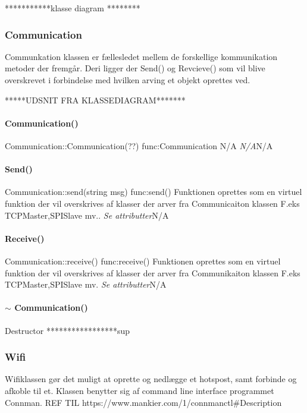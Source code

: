 ***********klasse diagram ********

\subsubsection{\textbf{Communication}}
Communkation klassen er fællesledet mellem de forskellige kommunikation metoder der fremgår. Deri ligger der Send() og Revcieve() som vil blive overskrevet i forbindelse med hvilken arving et objekt oprettes ved.

*****UDSNIT FRA KLASSEDIAGRAM*******

\paragraph{Communication()}
\begin{functionDescription}
{Communication::Communication(??)}
{func:Communication}
{N/A}
{\textit{N/A}}{N/A}
\end{functionDescription}

\paragraph{Send()}
\begin{functionDescription}
{Communication::send(string msg)}
{func:send()}
{Funktionen oprettes som en virtuel funktion der vil overskrives af klasser der arver fra Communicaiton klassen F.eks TCPMaster,SPISlave mv..}
{\textit{Se attributter}}{N/A}
\end{functionDescription}

\paragraph{Receive()}
\begin{functionDescription}
{Communication::receive()}
{func:receive()}
{Funktionen oprettes som en virtuel funktion der vil overskrives af klasser der arver fra Communikaiton klassen F.eks TCPMaster,SPISlave mv.}
{\textit{Se attributter}}{N/A}
\end{functionDescription}


\paragraph{$\sim$ Communication()}
Destructor *****************sup


\subsubsection{Wifi}
Wifiklassen gør det muligt at oprette og nedlægge et hotspost, samt forbinde og afkoble til et. Klassen benytter sig af command line interface programmet Connman. REF TIL https://www.mankier.com/1/connmanctl\#Description



